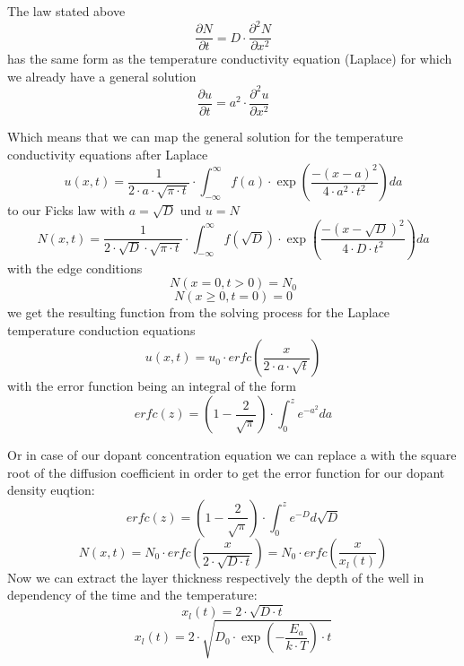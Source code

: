 The law stated above
\begin{equation}
\frac{\partial N}{\partial t} = D \cdot \frac{\partial^2 N}{\partial x^2} 
\end{equation}
has the same form as the temperature conductivity equation (Laplace) for which we already have a general solution
\begin{equation}
\frac{\partial u}{\partial t} = a^2 \cdot \frac{\partial^2 u}{\partial x^2} 
\end{equation}

Which means that we can map the general solution for the temperature conductivity equations after Laplace
\begin{equation}
u(x,t) = \frac{1}{2 \cdot a \cdot \sqrt{\pi \cdot t}} \cdot \int_{-\infty}^{\infty}{f(a)\cdot\exp\left(\frac{-(x-a)^2}{4 \cdot a^2 \cdot t^2}\right)}da
\end{equation}
to our Ficks law with $a=\sqrt{D}$ und $u=N$
\begin{equation}
N(x,t) = \frac{1}{2 \cdot \sqrt{D} \cdot \sqrt{\pi \cdot t}} \cdot \int_{-\infty}^{\infty}{f(\sqrt{D})\cdot\exp\left(\frac{-(x-\sqrt{D})^2}{4 \cdot D \cdot t^2}\right)}da
\label{eq:ficks_law_expanded}
\end{equation}
with the edge conditions
\begin{equation}
N( x=0 , t > 0 ) = N_0
\end{equation}
\begin{equation}
N( x \geq 0 ,  t = 0 ) = 0
\end{equation}
we get the resulting function from the solving process for the Laplace temperature conduction equations
\begin{equation}
u(x,t)=u_0 \cdot erfc\left(\frac{x}{2 \cdot a \cdot \sqrt{t}}\right)
\end{equation}
with the error function being an integral of the form
\begin{equation}
erfc(z)
=
\left(1-\frac{2}{\sqrt{\pi}}\right)\cdot\int_0^z{e^{-a^2}}da
\end{equation}

Or in case of our dopant concentration equation we can replace a with the square root of the diffusion coefficient in order to get the error function for our dopant density euqtion:
\begin{equation}
erfc(z)
=
\left(1-\frac{2}{\sqrt{\pi}}\right)\cdot\int_0^z{e^{-D}}d\sqrt{D}
\end{equation}
\begin{equation}
N(x,t)
=
N_0 \cdot erfc\left(\frac{x}{2 \cdot \sqrt{D \cdot t}}\right)
=
N_0 \cdot erfc\left(\frac{x}{x_l(t)}\right)
\end{equation}
Now we can extract the layer thickness respectively the depth of the well in dependency of the time and the temperature:
\begin{equation}
x_l(t) = 2 \cdot \sqrt{D \cdot t}
\end{equation}
\begin{equation}
x_l(t) = 2 \cdot \sqrt{D_0 \cdot \exp\left(-\frac{E_a}{k \cdot T}\right) \cdot t}
\end{equation}

